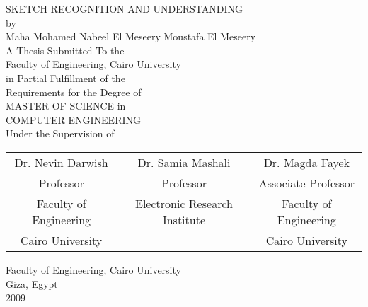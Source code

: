 \documentclass[12pt,onehalfspacing]{SketchThesis}
\begin{document}
\newpage    
\thispagestyle{empty}               %
 \begin{center}     
 SKETCH RECOGNITION AND UNDERSTANDING\\
\normalsize by      \\ 
  Maha Mohamed Nabeel El Meseery Moustafa El Meseery\\
\vspace*{0.4in}        
\normalsize
A Thesis Submitted To the\\
Faculty of Engineering, Cairo University\\
in Partial Fulfillment of the\\
Requirements for the Degree of\\
MASTER OF SCIENCE
in\\
COMPUTER ENGINEERING\\
\vspace*{0.4in} 
Under the Supervision of 
\end{center}
  \vspace*{0.4in} 
\begin{center}
 		\begin{tabular}{ccc}
		Dr. Nevin Darwish  & Dr. Samia Mashali & Dr. Magda Fayek \\
		 Professor   & Professor & Associate Professor  \\
		 Faculty of Engineering& Electronic Research Institute & 		 Faculty of Engineering \\
		  Cairo University && Cairo University\\
		\end{tabular}
\end{center}
  \vspace*{0.4in}       
  \vfill
\begin{center}
   Faculty of Engineering, Cairo University \\ Giza, Egypt \\ 2009
\end{center}
 
\newpage       
\thispagestyle{empty}               %
 
\end{document}
